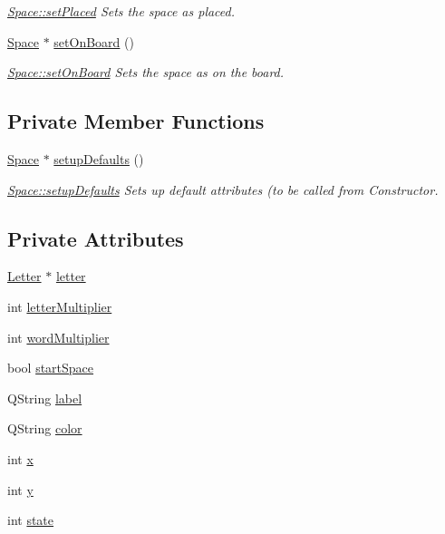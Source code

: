 \begin{DoxyCompactItemize}
\begin{DoxyCompactList}\small\item\em \hyperlink{class_space_a092351d8c32b8f89a78fc475a49b3b21}{Space\-::set\-Placed} Sets the space as placed. \end{DoxyCompactList}\item 
\hyperlink{class_space}{Space} $\ast$ \hyperlink{class_space_ae565aeac581e7ac3ab35b1f900140e3f}{set\-On\-Board} ()
\begin{DoxyCompactList}\small\item\em \hyperlink{class_space_ae565aeac581e7ac3ab35b1f900140e3f}{Space\-::set\-On\-Board} Sets the space as on the board. \end{DoxyCompactList}\end{DoxyCompactItemize}
\subsection*{Private Member Functions}
\begin{DoxyCompactItemize}
\item 
\hyperlink{class_space}{Space} $\ast$ \hyperlink{class_space_a79cb95622a3e11a8ebc7e5402e6116e3}{setup\-Defaults} ()
\begin{DoxyCompactList}\small\item\em \hyperlink{class_space_a79cb95622a3e11a8ebc7e5402e6116e3}{Space\-::setup\-Defaults} Sets up default attributes (to be called from Constructor. \end{DoxyCompactList}\end{DoxyCompactItemize}
\subsection*{Private Attributes}
\begin{DoxyCompactItemize}
\item 
\hyperlink{class_letter}{Letter} $\ast$ \hyperlink{class_space_ab899363fba4ab54c907df80a99e8e563}{letter}
\item 
int \hyperlink{class_space_a9bae20cdb32f38dd2386024db0443b22}{letter\-Multiplier}
\item 
int \hyperlink{class_space_a00b205e763885903d7b8a811ae0daa54}{word\-Multiplier}
\item 
bool \hyperlink{class_space_aa135c863552d2a89de1f5e1410fb9450}{start\-Space}
\item 
Q\-String \hyperlink{class_space_a7e949645659466705ca605a0aef73287}{label}
\item 
Q\-String \hyperlink{class_space_aa26e0bcc52344b863a274af75651e454}{color}
\item 
int \hyperlink{class_space_a21f4a2964d98ed619fc7a1c1bd3b1ad8}{x}
\item 
int \hyperlink{class_space_a11c7532ed7e01f58a55ac78a0b6be6f4}{y}
\item 
int \hyperlink{class_space_a9c634262ea140c752cd0f12ca8de3d63}{state}
\end{DoxyCompactItemize}
